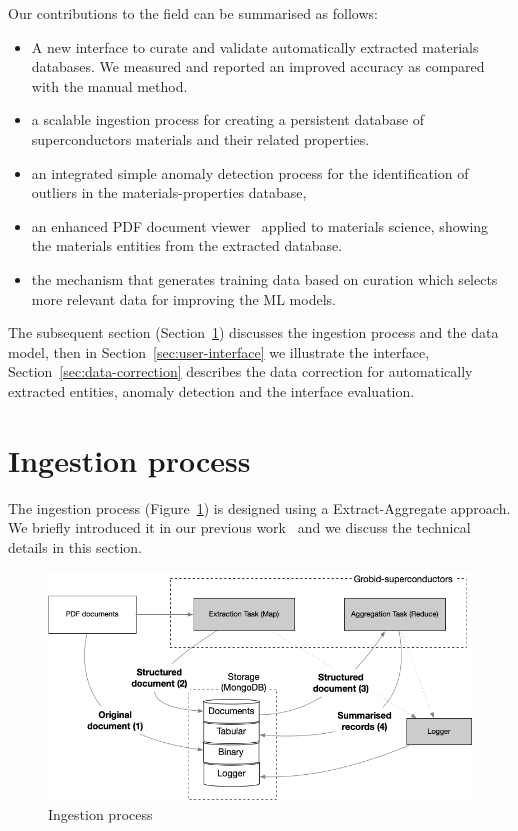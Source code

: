 \documentclass[a4paper]{article}
\begin{document}
Our contributions to the field can be summarised as follows:
\begin{itemize}
    \item A new interface to curate and validate automatically extracted materials databases. We measured and reported an improved accuracy as compared with the manual method.
    \item a scalable ingestion process for creating a persistent database of superconductors materials and their related properties.
    \item an integrated simple anomaly detection process for the identification of outliers in the materials-properties database, 
    \item an enhanced PDF document viewer~\cite{wang2022hammer} applied to materials science, showing the materials entities from the extracted database. 
    \item the mechanism that generates training data based on curation which selects more relevant data for improving the ML models.
\end{itemize}

The subsequent section (Section~\ref{sec:ingestion}) discusses the ingestion process and the data model, then in Section~\ref{sec:user-interface} we illustrate the interface, Section~\ref{sec:data-correction} describes the data correction for automatically extracted entities, anomaly detection and the interface evaluation. 


\section{Ingestion process}
\label{sec:ingestion}

The ingestion process (Figure~\ref{fig:map-reduce}) is designed using a Extract-Aggregate approach. 
We briefly introduced it in our previous work~\cite{lfoppiano2023automatic} and we discuss the technical details in this section. 

\begin{figure}[ht]
  \centering
  \includegraphics[width=\textwidth]{images/ingestion-schema.png} 
  \caption{Ingestion process}
  \label{fig:map-reduce}
\end{figure}
\end{document}
